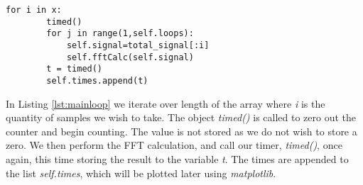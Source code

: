 \begin{lstlisting}[caption={Main Loop Execution},label=lst:mainloop,firstnumber=45]
    for i in x:
        timed()
        for j in range(1,self.loops):
            self.signal=total_signal[:i]
            self.fftCalc(self.signal)
        t = timed()
        self.times.append(t)
\end{lstlisting}
In Listing \ref{lst:mainloop} we iterate over length of the array where \emph{i} is the quantity of samples we wish to take. The object \emph{timed()} is called to zero out the counter and begin counting. The value is not stored as we do not wish to store a zero. We then perform the FFT calculation, and call our timer, \emph{timed()}, once again, this time storing the result to the variable \emph{t}. The times are appended to the list \emph{self.times}, which will be plotted later using \emph{matplotlib}.



